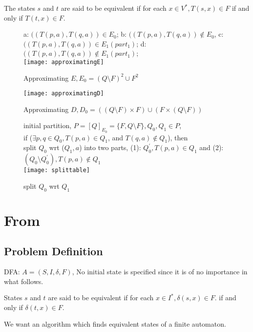 \begin{definition}
	The states $s$ and $t$ are said to be equivalent if for each $x\in V^\ast, T(s,x)\in F$ if and only if $T(t,x)\in F$. 
\end{definition}

\begin{figure}[htbp]
	a: $((T(p,a),T(q,a))\in E_0$; b: $((T(p,a),T(q,a))\notin E_0$, c: $((T(p,a),T(q,a))\in E_1(part_1)$; d: $((T(p,a),T(q,a))\notin E_1(part_1)$;\\
	\texttt{[image: approximatingE]}
	\caption{Approximating $E, E_0=(Q\setminus F)^2\cup F^2$ }
\end{figure}

\begin{figure}[htbp]
	\texttt{[image: approximatingD]}
	\caption{Approximating $D, D_0=((Q\setminus F)\times F)\cup (F\times (Q\setminus F))$ }
\end{figure}

\begin{figure}[htbp]
	initial partition, $P=[Q]_{E_0}=\{F,Q\setminus F\},Q_0,Q_1\in P$, \\
	if ($\exists p,q\in Q_0,T(p,a)\in Q_1$, and  $T(q,a)\notin Q_1$), then \\
	split $Q_0$ wrt ($Q_1,a$) into two parts, (1): $Q_0^\prime, T(p,a)\in Q_1$ and (2): $(Q_0\setminus Q_0^\prime),T(p,a)\notin Q_1$ \\
	\texttt{[image: splittable]}
	\caption{split $Q_0$ wrt $Q_1$ }
\end{figure}

\section{From \cite{Gries73}}

\subsection{Problem Definition}

DFA: $A=(S,I,\delta,F)$, No initial state is specified since it is of no importance in what follows.

\begin{definition}
	States $s$ and $t$ are said to be equivalent if for each $x\in I^\ast,\delta(s,x)\in F$. if and only if $\delta(t,x)\in F$.
\end{definition}

We want an algorithm which finds equivalent states of a finite automaton.


